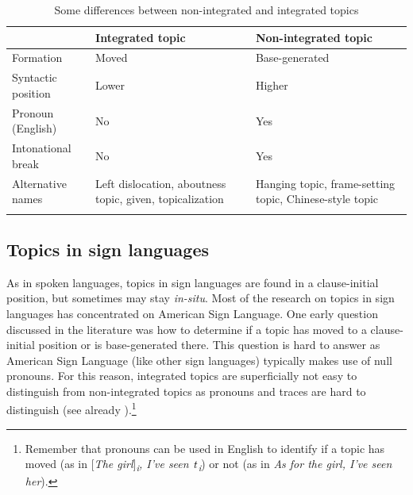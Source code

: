 \begin{table}
\begin{tabularx}{\textwidth}{lQQ}
\lsptoprule
 &  Integrated topic & Non-integrated topic   \\\midrule
Formation & Moved & Base-generated   \\
Syntactic position & Lower & Higher   \\
Pronoun (English) & No & Yes   \\
Intonational break & No & Yes   \\
Alternative names & Left dislocation, aboutness topic, given, topicalization & Hanging topic, frame-setting topic, Chinese-style topic\\
\lspbottomrule
\end{tabularx}
\caption{Some differences between non-integrated and integrated topics\label{ldhtdiffnew}}
\end{table}

\newpage 
\subsection{Topics in sign languages}\label{topicsinsignlanguages}
\largerpage
As in spoken languages, topics in sign languages are found in a clause-initial position, but sometimes may stay \textit{in-situ}. Most of the research on topics in sign languages has concentrated on American Sign Language. One early question discussed in the literature was how to determine if a topic has moved to a clause-initial position or is base-generated there. This question is hard to answer as American Sign Language (like other sign languages) typically makes use of null pronouns. For this reason, integrated topics are superficially not easy to distinguish from non-integrated topics as pronouns and traces are hard to distinguish (see already \citealt{lillo1986two, lillo1986parameter}).\footnote{Remember that pronouns can be used in English to identify if a topic has moved (as in \textit{$[$The girl$]$\textsubscript{i}, I've seen $\textrm{\textit{t}}$\textsubscript{i}}) or not (as in \textit{As for the girl, I've seen her}).}

